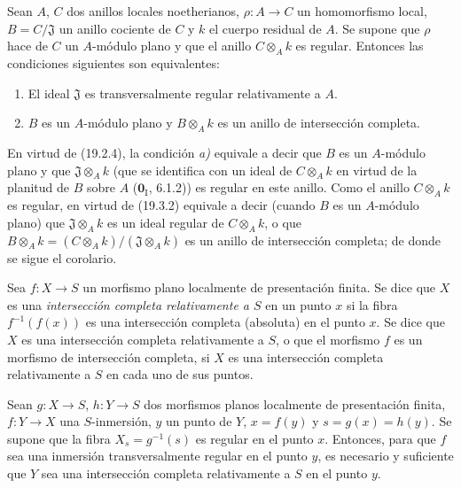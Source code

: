 \begin{corollary}[19.3.5]
\label{IV.19.3.5}
Sean $A$, $C$ dos anillos locales noetherianos, $\rho:A\to C$ un homomorfismo local, $B=C/\mathfrak J$ un anillo cociente de $C$ y $k$ el cuerpo residual de $A$. Se supone que $\rho$ hace de $C$ un $A$-módulo plano y que el anillo $C\otimes_A k$ es regular. Entonces las condiciones siguientes son equivalentes:
\begin{enumerate}
  \item[\textup{a)}] El ideal $\mathfrak J$ es transversalmente regular relativamente a $A$.
  \item[\textup{b)}] $B$ es un $A$-módulo plano y $B\otimes_A k$ es un anillo de intersección completa.
\end{enumerate}
\end{corollary}


En virtud de (19.2.4), la condición \emph{a)} equivale a decir que $B$ es un $A$-módulo plano y que $\mathfrak J\otimes_A k$ (que se identifica con un ideal de $C\otimes_A k$ en virtud de la planitud de $B$ sobre $A$ ($\mathbf{0}_{\mathrm I}$, 6.1.2)) es regular en este anillo. Como el anillo $C\otimes_A k$ es regular, en virtud de (19.3.2) equivale a decir (cuando $B$ es un $A$-módulo plano) que $\mathfrak J\otimes_A k$ es un ideal regular de $C\otimes_A k$, o que $B\otimes_A k=(C\otimes_A k)/(\mathfrak J\otimes_A k)$ es un anillo de intersección completa; de donde se sigue el corolario.

\begin{definition}[19.3.6]
\label{IV.19.3.6}
Sea $f:X\to S$ un morfismo plano localmente de presentación finita. Se dice que $X$ es una \emph{intersección completa relativamente a $S$} en un punto $x$ si la fibra $f^{-1}(f(x))$ es una intersección completa (absoluta) en el punto $x$. Se dice que $X$ es una intersección completa relativamente a $S$, o que el morfismo $f$ es un morfismo de intersección completa, si $X$ es una intersección completa relativamente a $S$ en cada uno de sus puntos.
\end{definition}

\begin{proposition}[19.3.7]
\label{IV.19.3.7}
Sean $g:X\to S$, $h:Y\to S$ dos morfismos planos localmente de presentación finita, $f:Y\to X$ una $S$-inmersión, $y$ un punto de $Y$, $x=f(y)$ y $s=g(x)=h(y)$. Se supone que la fibra $X_s=g^{-1}(s)$ es regular en el punto $x$. Entonces, para que $f$ sea una inmersión transversalmente regular en el punto $y$, es necesario y suficiente que $Y$ sea una intersección completa relativamente a $S$ en el punto $y$.
\end{proposition}


